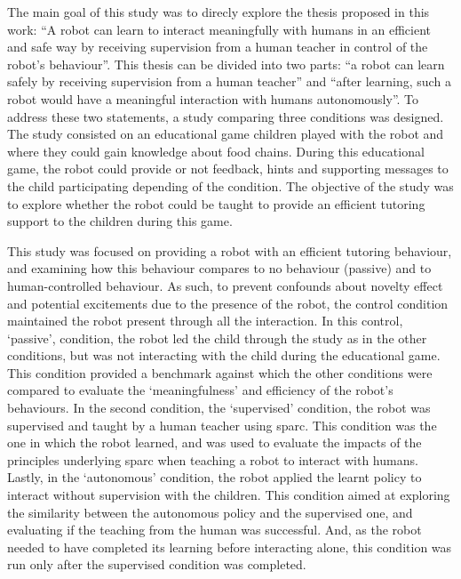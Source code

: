The main goal of this study was to direcly explore the thesis proposed in this work: ``A robot can learn to interact meaningfully with humans in an efficient and safe way by receiving supervision from a human teacher in control of the robot's behaviour''. This thesis can be divided into two parts: ``a robot can learn safely by receiving supervision from a human teacher'' and ``after learning, such a robot would have a meaningful interaction with humans autonomously''. To address these two statements, a study comparing three conditions was designed. The study consisted on an educational game children played with the robot and where they could gain knowledge about food chains. During this educational game, the robot could provide or not feedback, hints and supporting messages to the child participating depending of the condition. The objective of the study was to explore whether the robot could be taught to provide an efficient tutoring support to the children during this game.

This study was focused on providing a robot with an efficient tutoring behaviour, and examining how this behaviour compares to no behaviour (passive) and to human-controlled behaviour. As such, to prevent confounds about novelty effect and potential excitements due to the presence of the robot, the control condition maintained the robot present through all the interaction. In this control, `passive', condition, the robot led the child through the study as in the other conditions, but was not interacting with the child during the educational game. This condition provided a benchmark against which the other conditions were compared to evaluate the `meaningfulness' and efficiency of the robot's behaviours. In the second condition, the `supervised' condition, the robot was supervised and taught by a human teacher using \gls{sparc}. This condition was the one in which the robot learned, and was used to evaluate the impacts of the principles underlying \gls{sparc} when teaching a robot to interact with humans. Lastly, in the `autonomous' condition, the robot applied the learnt policy to interact without supervision with the children. This condition aimed at exploring the similarity between the autonomous policy and the supervised one, and evaluating if the teaching from the human was successful. And, as the robot needed to have completed its learning before interacting alone, this condition was run only after the supervised condition was completed.

